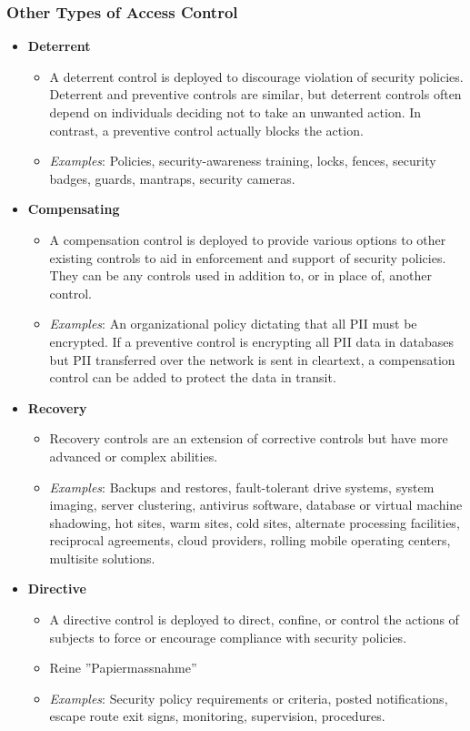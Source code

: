 \subsubsection{Other Types of Access Control}
\begin{itemize}
    \item \textbf{Deterrent}
    \begin{itemize}
        \item A deterrent control is deployed to discourage violation of security policies. Deterrent and preventive controls are similar, but deterrent controls often depend on individuals deciding not to take an unwanted action. In contrast, a preventive control actually blocks the action.
        \item \textit{Examples}: Policies, security-awareness training, locks, fences, security badges, guards, mantraps, security cameras.        
    \end{itemize}
    \item \textbf{Compensating}
    \begin{itemize}
        \item A compensation control is deployed to provide various options to other existing controls to aid in enforcement and support of security policies. They can be any controls used in addition to, or in place of, another control.
        \item \textit{Examples}: An organizational policy dictating that all PII must be encrypted. If a preventive control is encrypting all PII data in databases but PII transferred over the network is sent in cleartext, a compensation control can be added to protect the data in transit.
    \end{itemize}
    \item \textbf{Recovery}
    \begin{itemize}
        \item Recovery controls are an extension of corrective controls but have more advanced or complex abilities.
        \item \textit{Examples}: Backups and restores, fault-tolerant drive systems, system imaging, server clustering, antivirus software, database or virtual machine shadowing, hot sites, warm sites, cold sites, alternate processing facilities, reciprocal agreements, cloud providers, rolling mobile operating centers, multisite solutions.
    \end{itemize}
    \item \textbf{Directive}
    \begin{itemize}
        \item A directive control is deployed to direct, confine, or control the actions of subjects to force or encourage compliance with security policies.
        \item Reine ''Papiermassnahme''
        \item \textit{Examples}: Security policy requirements or criteria, posted notifications, escape route exit signs, monitoring, supervision, procedures.
    \end{itemize}
\end{itemize}

